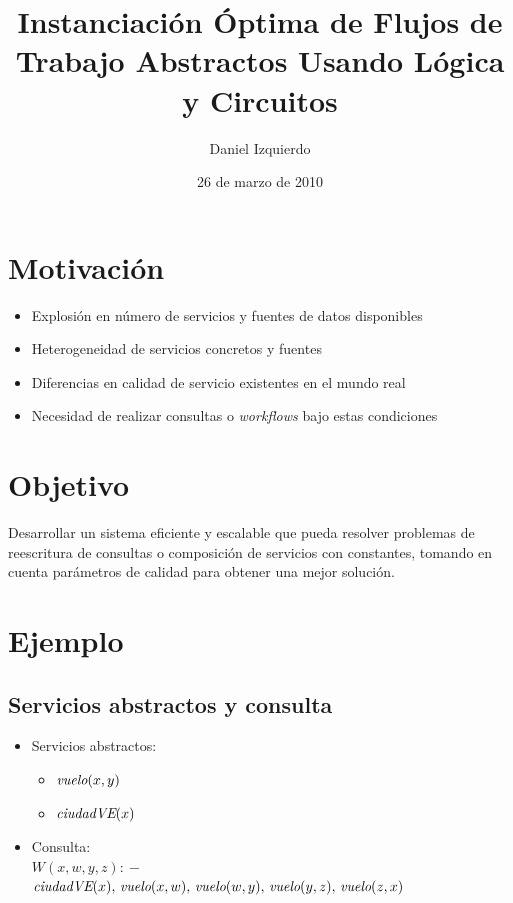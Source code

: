 \documentclass{beamer}
\title{Instanciación Óptima de Flujos de Trabajo Abstractos Usando Lógica y Circuitos}
\author{Daniel Izquierdo}
\date{26 de marzo de 2010}
\newcommand{\qrule}{:\!\!-}
\newcommand{\vuelo}{\text{\it vuelo}}
\newcommand{\ciudadVE}{\text{\it ciudadVE}}
\begin{document}
\frame{\titlepage}


\section[Contenido]{}
\frame{\tableofcontents}


\section{Motivación}
\frame
{

\begin{itemize}
\item Explosión en número de servicios y fuentes de datos disponibles
\item Heterogeneidad de servicios concretos y fuentes
\item Diferencias en calidad de servicio existentes en el mundo real
    \item Necesidad de realizar consultas o \emph{workflows} bajo estas condiciones
\end{itemize}
}


\section{Objetivo}
\frame
{
Desarrollar un sistema eficiente y escalable que pueda resolver problemas de
reescritura de consultas o composición de servicios con constantes, tomando en
cuenta parámetros de calidad para obtener una mejor solución.
}


\section{Ejemplo}

\subsection{Servicios abstractos y consulta}

\frame
{
    \begin{itemize}
    \item Servicios abstractos:
        \begin{itemize}
        \item $\vuelo(x,y)$
        \item $\ciudadVE(x)$
        \end{itemize}
    \item Consulta:\\ $W(x,w,y,z) \qrule$\\ $\ciudadVE(x),\,\vuelo(x,w),\,\vuelo(w,y),\,\vuelo(y,z),\,\vuelo(z,x)$
    \end{itemize}
}
\end{document}
